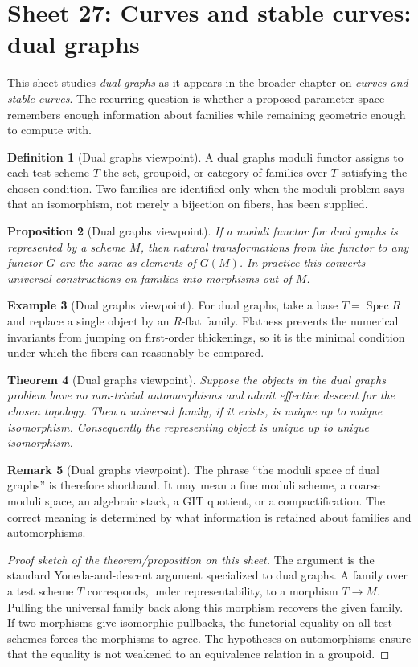 \documentclass[11pt]{amsart}
\newtheorem{theorem}{Theorem}[section]
\newtheorem{proposition}[theorem]{Proposition}
\theoremstyle{definition}
\newtheorem{definition}[theorem]{Definition}
\newtheorem{example}[theorem]{Example}
\newtheorem{remark}[theorem]{Remark}
\newcommand{\Spec}{\operatorname{Spec}}
\begin{document}
\section{Sheet 27: Curves and stable curves: dual graphs}
This sheet studies \emph{dual graphs} as it appears in the broader chapter on \emph{curves and stable curves}.  The recurring question is whether a proposed parameter space remembers enough information about families while remaining geometric enough to compute with.
\begin{definition}[Dual graphs viewpoint]
A dual graphs moduli functor assigns to each test scheme $T$ the set, groupoid, or category of families over $T$ satisfying the chosen condition.  Two families are identified only when the moduli problem says that an isomorphism, not merely a bijection on fibers, has been supplied.
\end{definition}
\begin{proposition}[Dual graphs viewpoint]
If a moduli functor for dual graphs is represented by a scheme $M$, then natural transformations from the functor to any functor $G$ are the same as elements of $G(M)$.  In practice this converts universal constructions on families into morphisms out of $M$.
\end{proposition}
\begin{example}[Dual graphs viewpoint]
For dual graphs, take a base $T=\Spec R$ and replace a single object by an $R$-flat family.  Flatness prevents the numerical invariants from jumping on first-order thickenings, so it is the minimal condition under which the fibers can reasonably be compared.
\end{example}
\begin{theorem}[Dual graphs viewpoint]
Suppose the objects in the dual graphs problem have no non-trivial automorphisms and admit effective descent for the chosen topology.  Then a universal family, if it exists, is unique up to unique isomorphism.  Consequently the representing object is unique up to unique isomorphism.
\end{theorem}
\begin{remark}[Dual graphs viewpoint]
The phrase ``the moduli space of dual graphs'' is therefore shorthand.  It may mean a fine moduli scheme, a coarse moduli space, an algebraic stack, a GIT quotient, or a compactification.  The correct meaning is determined by what information is retained about families and automorphisms.
\end{remark}
\begin{proof}[Proof sketch of the theorem/proposition on this sheet]
The argument is the standard Yoneda-and-descent argument specialized to dual graphs.  A family over a test scheme $T$ corresponds, under representability, to a morphism $T\to M$.  Pulling the universal family back along this morphism recovers the given family.  If two morphisms give isomorphic pullbacks, the functorial equality on all test schemes forces the morphisms to agree.  The hypotheses on automorphisms ensure that the equality is not weakened to an equivalence relation in a groupoid.
\end{proof}
\end{document}
